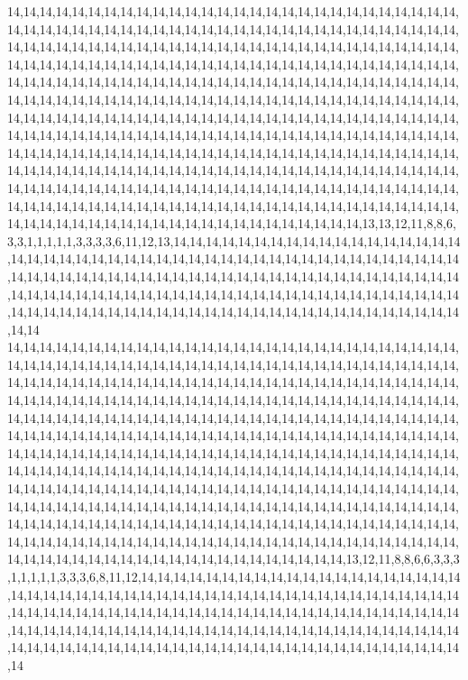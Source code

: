 14,14,14,14,14,14,14,14,14,14,14,14,14,14,14,14,14,14,14,14,14,14,14,14,14,14,14,14,14,14,14,14,14,14,14,14,14,14,14,14,14,14,14,14,14,14,14,14,14,14,14,14,14,14,14,14,14,14,14,14,14,14,14,14,14,14,14,14,14,14,14,14,14,14,14,14,14,14,14,14,14,14,14,14,14,14,14,14,14,14,14,14,14,14,14,14,14,14,14,14,14,14,14,14,14,14,14,14,14,14,14,14,14,14,14,14,14,14,14,14,14,14,14,14,14,14,14,14,14,14,14,14,14,14,14,14,14,14,14,14,14,14,14,14,14,14,14,14,14,14,14,14,14,14,14,14,14,14,14,14,14,14,14,14,14,14,14,14,14,14,14,14,14,14,14,14,14,14,14,14,14,14,14,14,14,14,14,14,14,14,14,14,14,14,14,14,14,14,14,14,14,14,14,14,14,14,14,14,14,14,14,14,14,14,14,14,14,14,14,14,14,14,14,14,14,14,14,14,14,14,14,14,14,14,14,14,14,14,14,14,14,14,14,14,14,14,14,14,14,14,14,14,14,14,14,14,14,14,14,14,14,14,14,14,14,14,14,14,14,14,14,14,14,14,14,14,14,14,14,14,14,14,14,14,14,14,14,14,14,14,14,14,14,14,14,14,14,14,14,14,14,14,14,14,14,14,14,14,14,14,14,14,14,14,14,14,14,14,14,14,14,14,14,14,14,14,14,14,14,14,14,14,14,14,14,14,14,14,14,14,14,14,14,14,14,14,14,14,14,14,14,14,14,14,14,14,14,14,13,13,12,11,8,8,6,3,3,1,1,1,1,1,3,3,3,3,6,11,12,13,14,14,14,14,14,14,14,14,14,14,14,14,14,14,14,14,14,14,14,14,14,14,14,14,14,14,14,14,14,14,14,14,14,14,14,14,14,14,14,14,14,14,14,14,14,14,14,14,14,14,14,14,14,14,14,14,14,14,14,14,14,14,14,14,14,14,14,14,14,14,14,14,14,14,14,14,14,14,14,14,14,14,14,14,14,14,14,14,14,14,14,14,14,14,14,14,14,14,14,14,14,14,14,14,14,14,14,14,14,14,14,14,14,14,14,14,14,14,14,14,14,14,14,14,14,14,14,14,14,14,14,14
14,14,14,14,14,14,14,14,14,14,14,14,14,14,14,14,14,14,14,14,14,14,14,14,14,14,14,14,14,14,14,14,14,14,14,14,14,14,14,14,14,14,14,14,14,14,14,14,14,14,14,14,14,14,14,14,14,14,14,14,14,14,14,14,14,14,14,14,14,14,14,14,14,14,14,14,14,14,14,14,14,14,14,14,14,14,14,14,14,14,14,14,14,14,14,14,14,14,14,14,14,14,14,14,14,14,14,14,14,14,14,14,14,14,14,14,14,14,14,14,14,14,14,14,14,14,14,14,14,14,14,14,14,14,14,14,14,14,14,14,14,14,14,14,14,14,14,14,14,14,14,14,14,14,14,14,14,14,14,14,14,14,14,14,14,14,14,14,14,14,14,14,14,14,14,14,14,14,14,14,14,14,14,14,14,14,14,14,14,14,14,14,14,14,14,14,14,14,14,14,14,14,14,14,14,14,14,14,14,14,14,14,14,14,14,14,14,14,14,14,14,14,14,14,14,14,14,14,14,14,14,14,14,14,14,14,14,14,14,14,14,14,14,14,14,14,14,14,14,14,14,14,14,14,14,14,14,14,14,14,14,14,14,14,14,14,14,14,14,14,14,14,14,14,14,14,14,14,14,14,14,14,14,14,14,14,14,14,14,14,14,14,14,14,14,14,14,14,14,14,14,14,14,14,14,14,14,14,14,14,14,14,14,14,14,14,14,14,14,14,14,14,14,14,14,14,14,14,14,14,14,14,14,14,14,14,14,14,14,14,14,14,14,14,14,14,14,14,14,14,14,14,14,14,14,14,14,13,12,11,8,8,6,6,3,3,3,1,1,1,1,1,3,3,3,6,8,11,12,14,14,14,14,14,14,14,14,14,14,14,14,14,14,14,14,14,14,14,14,14,14,14,14,14,14,14,14,14,14,14,14,14,14,14,14,14,14,14,14,14,14,14,14,14,14,14,14,14,14,14,14,14,14,14,14,14,14,14,14,14,14,14,14,14,14,14,14,14,14,14,14,14,14,14,14,14,14,14,14,14,14,14,14,14,14,14,14,14,14,14,14,14,14,14,14,14,14,14,14,14,14,14,14,14,14,14,14,14,14,14,14,14,14,14,14,14,14,14,14,14,14,14,14,14,14,14,14,14,14,14,14,14
